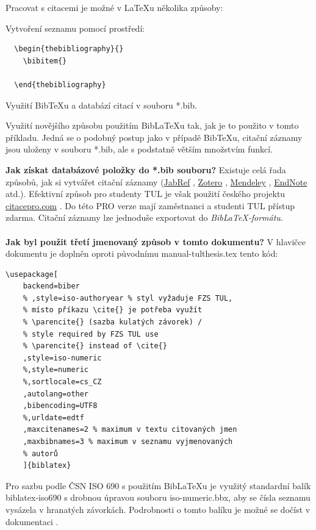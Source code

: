 \documentclass[FZS,DP,EN]{tulthesis}
\newcommand{\argument}[1]{{\ttfamily\color{\tulcolor}#1}}
\newenvironment{myquote}{\begin{list}{}{\setlength\leftmargin\parindent}\item[]}{\end{list}}
\newenvironment{listing}{\begin{myquote}\color{\tulcolor}}{\end{myquote}}
\begin{document}
Pracovat s citacemi je možné v \LaTeX{}u několika způsoby: 
\begin{enumerate}
  \item Vytvoření seznamu pomocí prostředí: 
  \begin{listing}
  \begin{verbatim}
  \begin{thebibliography}{}
    \bibitem{}
   
  \end{thebibliography}
  \end{verbatim}
  \end{listing}
  \item Využití Bib\TeX{}u a databází citací v souboru \argument{*.bib}.
  \item Využití novějšího způsobu použitím Bib\LaTeX{}u tak, jak je to použito v tomto příkladu. Jedná se o podobný postup jako v případě Bib\TeX{}u, citační záznamy jsou uloženy v souboru \argument{*.bib}, ale s podstatně větším množstvím funkcí. 
\end{enumerate}

\textbf{Jak získat databázové položky do \argument{*.bib} souboru?} Existuje celá řada způsobů, jak si vytvářet citační záznamy (\href{www.jabref.org}{JabRef} \cite{webJabRef}, \href{https://www.zotero.org}{Zotero} \cite{webZotero}, \href{https://www.mendeley.com}{Mendeley} \cite{webMendeley}, \href{https://endnote.com}{EndNote} \cite{webEndNote} atd.). Efektivní způsob pro studenty TUL je však použití českého projektu \href{citacepro.com}{citacepro.com} \cite{webCitaceCOM}. Do této PRO verze mají zaměstnanci a studenti TUL přístup zdarma. Citační záznamy lze jednoduše exportovat do \emph{Bib\LaTeX-formátu}. 

\paragraph{}
\textbf{Jak byl použit třetí jmenovaný způsob v tomto dokumentu?}
V hlavičce dokumentu je doplněn oproti původnímu \argument{manual-tulthesis.tex} tento kód:
\begin{listing}
\begin{verbatim}
\usepackage[ 
    backend=biber
    % ,style=iso-authoryear % styl vyžaduje FZS TUL, 
    % místo příkazu \cite{} je potřeba využít 
    % \parencite{} (sazba kulatých závorek) / 
    % style required by FZS TUL use 
    % \parencite{} instead of \cite{}
    ,style=iso-numeric
    %,style=numeric
    %,sortlocale=cs_CZ
    ,autolang=other
    ,bibencoding=UTF8
    %,urldate=edtf
    ,maxcitenames=2 % maximum v textu citovaných jmen
    ,maxbibnames=3 % maximum v seznamu vyjmenovaných 
    % autorů
    ]{biblatex}

\end{verbatim}
\end{listing}
Pro sazbu podle ČSN ISO 690 s použitím Bib\LaTeX{}u je využitý standardní balík \argument{biblatex-iso690} s drobnou úpravou souboru \argument{iso-numeric.bbx}, aby se čísla seznamu vysázela v hranatých závorkách. Podrobnosti o tomto balíku je možné se dočíst v dokumentaci \cite{webBiblatex-ISO690}.
\end{document}
